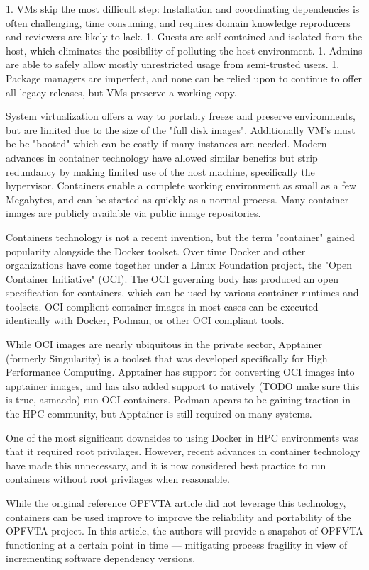 1. VMs skip the most difficult step: Installation and coordinating dependencies is often challenging, time consuming, and requires domain knowledge reproducers and reviewers are likely to lack.
1. Guests are self-contained and isolated from the host, which eliminates the posibility of polluting the host environment.
1. Admins are able to safely allow mostly unrestricted usage from semi-trusted users.
1. Package managers are imperfect, and none can be relied upon to continue to offer all legacy releases, but VMs preserve a working copy.

System virtualization offers a way to portably freeze and preserve environments, but are limited due to the size of the "full disk images".
Additionally VM's must be be "booted" which can be costly if many instances are needed.
Modern advances in container technology have allowed similar benefits but strip redundancy by making limited use of the host machine, specifically the hypervisor.
Containers enable a complete working environment as small as a few Megabytes, and can be started as quickly as a normal process.
Many container images are publicly available via public image repositories.

Containers technology is not a recent invention, but the term "container" gained popularity alongside the Docker toolset.
Over time Docker and other organizations have come together under a Linux Foundation project, the "Open Container Initiative" (OCI).
The OCI governing body has produced an open specification for containers, which can be used by various container runtimes and toolsets.
OCI complient container images in most cases can be executed identically with Docker, Podman, or other OCI compliant tools.

While OCI images are nearly ubiquitous in the private sector, Apptainer (formerly Singularity) is a toolset that was developed specifically for High Performance Computing.
Apptainer has support for converting OCI images into apptainer images, and has also added support to natively (TODO make sure this is true, asmacdo) run OCI containers.
Podman apears to be gaining traction in the HPC community, but Apptainer is still required on many systems.

One of the most significant downsides to using Docker in HPC environments was that it required root privilages.
However, recent advances in container technology have made this unnecessary, and it is now considered best practice to run containers without root privilages when reasonable.

While the original reference OPFVTA article did not leverage this technology, containers can be used improve to improve the reliability and portability of the OPFVTA project.
In this article, the authors will provide a snapshot of OPFVTA functioning at a certain point in time — mitigating process fragility in view of incrementing software dependency versions.
